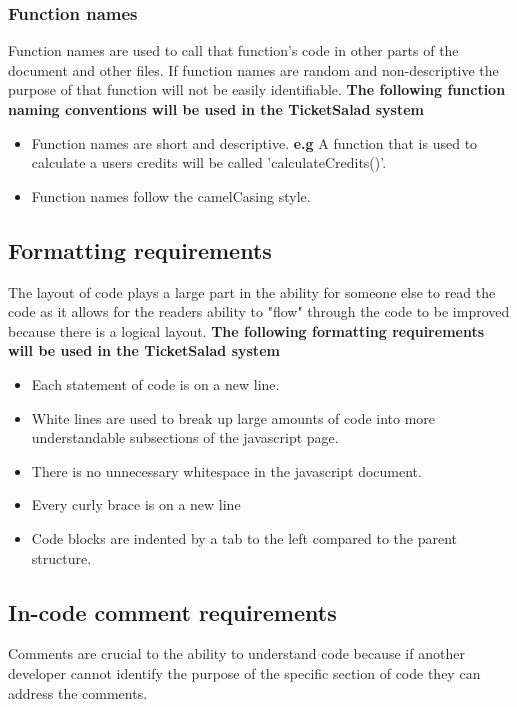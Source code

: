 \documentclass[11pt]{article}
\begin{document}
	\subsubsection{Function names}
	Function names are used to call that function's code in other parts of the document and other files. If function names are random and non-descriptive the purpose of that function will not be easily identifiable.
	\newline
	\textbf{The following function naming conventions will be used in the TicketSalad system}
	\begin{itemize}
		\item Function names are short and descriptive. \textbf{e.g} A function that is used to calculate a users credits will be called 'calculateCredits()'.
		\item Function names follow the camelCasing style.
	\end{itemize}
	\subsection{Formatting requirements}
	The layout of code plays a large part in the ability for someone else to read the code as it allows for the readers ability to "flow" through the code to be improved because there is a logical layout.
	\newline
	\textbf{The following formatting requirements will be used in the TicketSalad system}
	\newline
	\begin{itemize}
		\item Each statement of code is on a new line.
		\item White lines are used to break up large amounts of code into more understandable subsections of the javascript page.
		\item There is no unnecessary whitespace in the javascript document.
		\item Every curly brace is on a new line
		\item Code blocks are indented by a tab to the left compared to the parent structure.
	\end{itemize}
	\subsection{In-code comment requirements}
	Comments are crucial to the ability to understand code because if another developer cannot identify the purpose of the specific section of code they can address the comments.
	
\end{document}
